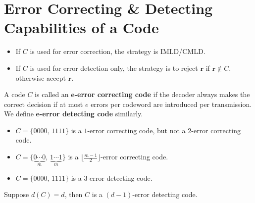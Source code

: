 
\section{Error Correcting \& Detecting Capabilities of a Code}
\begin{itemize}
    \item If $ C $ is used for error correction, the strategy is IMLD/CMLD.
    \item If $ C $ is used for error detection only, the strategy is
          to reject $ \bm{r} $ if $ \bm{r}\notin C $, otherwise accept $ \bm{r} $.
\end{itemize}
\begin{defbox}
    \begin{definition}
        A code $ C $ is called an \textbf{$\bm{e}$-error correcting code}
        if the decoder always makes the correct decision if
        at most $ e $ errors per codeword are introduced per transmission.
        We define \textbf{$\bm{e}$-error detecting code} similarly.
    \end{definition} \end{defbox}

\begin{exbox}
    \begin{example}
        \begin{itemize}
            \item $ C=\{0000,\,1111\} $ is a $ 1 $-error correcting code, but not a
                  $ 2 $-error correcting code.
            \item $ C=\{\underbrace{0\cdots 0}_{m},\,\underbrace{1\cdots 1}_{m}\} $
                  is a $ \lfloor \frac{m-1}{2} \rfloor $-error correcting code.
            \item $ C=\{0000,\,1111\} $ is a $ 3 $-error detecting code.
        \end{itemize}
    \end{example}
\end{exbox}

\begin{thmbox}
    \begin{theorem}
        Suppose $ d(C)=d $, then $ C $ is a $ (d-1) $-error detecting code.
    \end{theorem} \end{thmbox}

